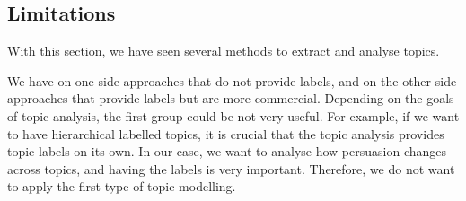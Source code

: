 





\subsection{\statusgreen Limitations}

With this section, we have seen several methods to extract and analyse topics.

We have on one side approaches that do not provide labels, and on the other side approaches that provide labels but are more commercial.
Depending on the goals of topic analysis, the first group could be not very useful. For example, if we want to have hierarchical labelled topics, it is crucial that the topic analysis provides topic labels on its own.
In our case, we want to analyse how persuasion changes across topics, and having the labels is very important. Therefore, we do not want to apply the first type of topic modelling.

